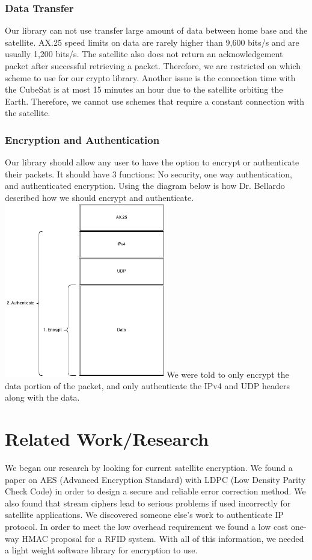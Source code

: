 \documentclass[12pt]{article}
\begin{document}
\begin{multicols}{2}
\subsubsection{Data Transfer}
Our library can not use transfer large amount of data between home base and the satellite. AX.25 speed limits on data are rarely higher than 9,600 bits/s and are usually 1,200 bits/s. The satellite also does not return an acknowledgement packet after successful retrieving a packet. Therefore, we are restricted on which scheme to use for our crypto library. Another issue is the connection time with the CubeSat is at most 15 minutes an hour due to the satellite orbiting the Earth. Therefore, we cannot use schemes that require a constant connection with the satellite. 
\subsubsection{Encryption and Authentication}
Our library should allow any user to have the option to encrypt or authenticate their packets. It should have 3 functions: No security, one way authentication, and authenticated encryption. Using the diagram below is how Dr. Bellardo described how we should encrypt and authenticate. \\
\begingroup
    \centering
    \includegraphics[width=7cm]{researchDiagram.png}
\endgroup
We were told to only encrypt the data portion of the packet, and only authenticate the IPv4 and UDP headers along with the data.
\section{Related Work/Research}
We began our research by looking for current satellite encryption. We found a paper on AES (Advanced Encryption Standard) with LDPC (Low Density Parity Check Code) in order to design a secure and reliable error correction method. \cite{SEEC} We also found that stream ciphers lead to serious problems if used incorrectly for satellite applications. \cite{stream_problems} We discovered someone else's work to authenticate IP protocol. \cite{IP_Protocol} In order to meet the low overhead requirement we found a low cost one-way HMAC proposal for a RFID system. \cite{HMAC_RFID} With all of this information, we needed a light weight software library for encryption to use. 

\end{multicols}
\end{document}
